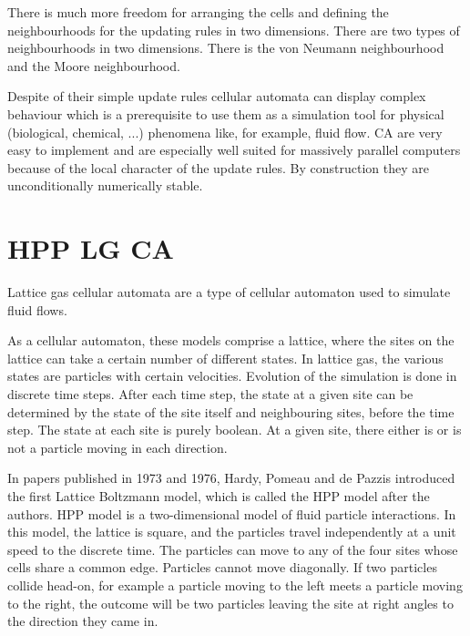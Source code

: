 \documentclass[paper=a4, fontsize=11pt]{scrartcl} %
\numberwithin{equation}{section} %
\numberwithin{figure}{section} %
\numberwithin{table}{section} %
\begin{document}
There is much more freedom for arranging the cells and defining the neighbourhoods for the updating rules in two dimensions. There are two types of neighbourhoods in two dimensions. There is the von Neumann neighbourhood and the Moore neighbourhood.

Despite of their simple update rules cellular automata can display complex
behaviour which is a prerequisite to use them as a simulation tool for physical
(biological, chemical, ...) phenomena like, for example, fluid flow. CA are
very easy to implement and are especially well suited for massively parallel
computers because of the local character of the update rules. By construction
they are unconditionally numerically stable. \cite{LGCA}


\section{HPP LG CA}
Lattice gas cellular automata are a type of cellular automaton used to simulate fluid flows.

As a cellular automaton, these models comprise a lattice, where the sites on the lattice can take a certain number of different states. In lattice gas, the various states are particles with certain velocities. Evolution of the simulation is done in discrete time steps. After each time step, the state at a given site can be determined by the state of the site itself and neighbouring sites, before the time step.
The state at each site is purely boolean. At a given site, there either is or is not a particle moving in each direction.

In papers published in 1973 and 1976, Hardy, Pomeau and de Pazzis introduced the first Lattice Boltzmann model, which is called the HPP model after the authors. HPP model is a two-dimensional model of fluid particle interactions. In this model, the lattice is square, and the particles travel independently at a unit speed to the discrete time. The particles can move to any of the four sites whose cells share a common edge. Particles cannot move diagonally.
If two particles collide head-on, for example a particle moving to the left meets a particle moving to the right, the outcome will be two particles leaving the site at right angles to the direction they came in. \cite{wiki-lg}
\end{document}
